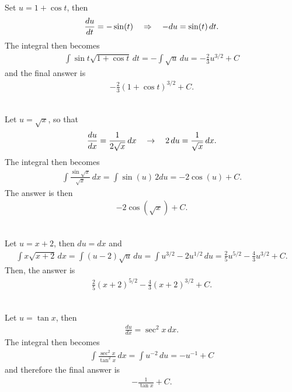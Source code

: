 	\spc
	
	\\
	Set $u = 1 + \cos t$, then
		\begin{align*}
		\frac{du}{dt} = -\sin (t) \quad \Rightarrow \quad -du = \sin (t) \, dt .
		\end{align*}
	The integral then becomes
		\begin{align*}
		\int \sin t \sqrt{ 1+ \cos t} \, dt = -\int \sqrt{u} \, du = -\tfrac{2}{3} u^{3/2} + C
		\end{align*}
	and the final answer is
		\begin{align*}
		-\tfrac{2}{3} (1 + \cos t)^{3/2} + C .
		\end{align*}
		
	\spc
	
	\\
	Let $u = \sqrt{x}$, so that
		\begin{align*}
		\frac{du}{dx} = \frac{1}{2 \sqrt{x}} \, dx \quad \rightarrow \quad 2 \, du = \frac{1}{\sqrt{x}} \, dx .
		\end{align*}
	The integral then becomes
		\begin{align*}
		\int \frac{\sin \sqrt{x}}{\sqrt{x}} \, dx = \int \sin (u) \, 2du = -2 \cos (u) + C .
		\end{align*}
	The answer is then
		\begin{align*}
		-2 \cos (\sqrt{x}) + C .
		\end{align*}
		
	\spc
	
	\\
	Let $u = x + 2$, then $du = dx$ and
		\begin{align*}
		\int x \sqrt{x + 2} \, dx = \int (u - 2) \sqrt{u} \, du = \int u^{3/2} - 2 u^{1/2} \, du = \tfrac{2}{5} u^{5/2} - \tfrac{4}{3} u^{3/2} + C .
		\end{align*}
	Then, the answer is
		\begin{align*}
		\tfrac{2}{5} (x + 2)^{5/2} - \tfrac{4}{3} (x + 2)^{3/2} + C .
		\end{align*}
	
	\spc
	
	\\
	Let $u = \tan x$, then
		\begin{align*}
		\frac{du}{dx} = \sec^2 x \, dx  .
		\end{align*}
	The integral then becomes
		\begin{align*}
		\int \frac{\sec^2 x}{\tan^2 x} \, dx = \int u^{-2} \, du = -u^{-1} + C
		\end{align*}			
	and therefore the final answer is
		\begin{align*}
		- \frac{1}{\tan x} + C .
		\end{align*}	
		
